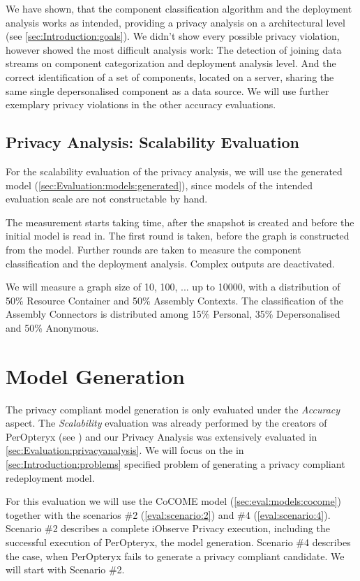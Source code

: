 We have shown, that the component classification algorithm and the deployment analysis works as intended, providing a privacy analysis on a architectural level (see \autoref{sec:Introduction:goals}). We didn't show every possible privacy violation, however showed the most difficult analysis work: The detection of joining data streams on component categorization and deployment analysis level. And the correct identification of a set of components, located on a server, sharing the same single depersonalised component as a data source. We will use further exemplary privacy violations in the other accuracy evaluations.

\subsection{Privacy Analysis: Scalability Evaluation}

For the scalability evaluation of the privacy analysis, we will use the generated model (\autoref{sec:Evaluation:models:generated}), since models of the intended evaluation scale are not constructable by hand. 

The measurement starts taking time, after the snapshot is created and before the initial model is read in. The first round is taken, before the graph is constructed from the model. Further rounds are taken to measure the component classification and the deployment analysis. Complex outputs are deactivated.

We will measure a graph size of 10, 100, ... up to 10000, with a distribution of 50\% Resource Container and 50\% Assembly Contexts. The classification of the Assembly Connectors is distributed among 15\% Personal, 35\% Depersonalised and 50\% Anonymous.


\section{Model Generation}
\label{sec:Evaluation:generation}

The privacy compliant model generation is only evaluated under the \textit{Accuracy} aspect. The \textit{Scalability} evaluation was already performed by the creators of PerOpteryx (see \cite{Koziolek.2014}) and our Privacy Analysis was extensively evaluated in \autoref{sec:Evaluation:privacyanalysis}. We will focus on the in \autoref{sec:Introduction:problems} specified problem of generating a privacy compliant redeployment model.

For this evaluation we will use the CoCOME model (\autoref{sec:eval:models:cocome}) together with the scenarios \#2 (\autoref{eval:scenario:2}) and \#4 (\autoref{eval:scenario:4}). Scenario \#2 describes a complete iObserve Privacy execution, including the successful execution of PerOpteryx, the model generation. Scenario \#4 describes the case, when PerOpteryx fails to generate a privacy compliant candidate. We will start with Scenario \#2.


